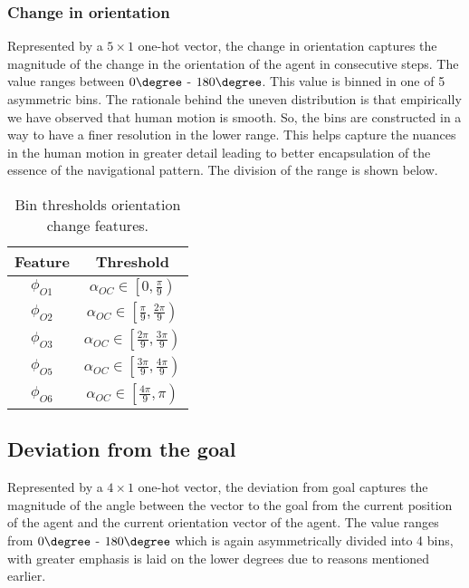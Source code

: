 \subsubsection*{Change in orientation}
Represented by a $5 \times 1$ one-hot vector, the change in orientation captures the magnitude of the change in the orientation of the agent in consecutive steps. The value ranges between $0 \degree$ -  $ 180 \degree$. This value is binned in one of 5 asymmetric bins. The rationale behind the uneven distribution is that empirically we have observed that human motion is smooth. So, the bins are constructed in a way to have a finer resolution in the lower range. This helps capture the nuances in the human motion in greater detail leading to better encapsulation of the essence of the navigational pattern. The division of the range is shown below.

\begin{table}[htbp]
	\caption{Bin thresholds orientation change features.}
	\label{orientation-change-bins}
	\begin{center}
		\renewcommand{\arraystretch}{1.3}
		\begin{tabular}{|c|c|}
			\hline
			Feature & Threshold \\
			\hline
			$\phi_{O1}$ & $\alpha_{OC} \in \left[ 0 , \frac{\pi}{9} \right)$ \\
			
			$\phi_{O2}$ & $\alpha_{OC} \in \left[ \frac{\pi}{9} , \frac{2\pi}{9} \right)$ \\
			
			$\phi_{O3}$ & $\alpha_{OC} \in \left[ \frac{2\pi}{9} , \frac{3\pi}{9} \right)$ \\
	
			
			$\phi_{O5}$ & $\alpha_{OC} \in \left[ \frac{3\pi}{9} , \frac{4\pi}{9} \right)$ \\
			
			$\phi_{O6}$ & $\alpha_{OC} \in \left[ \frac{4\pi}{9} , \pi \right)$ \\
			\hline
		\end{tabular}
	\end{center}
\end{table}
\subsection*{Deviation from the goal}
Represented by a $4 \times 1$ one-hot vector, the deviation from goal captures the magnitude of the angle between the vector to the goal from the current position of the agent and the current orientation vector of the agent. The value ranges from $0 \degree$ - $ 180 \degree$ which is again asymmetrically divided into 4 bins, with greater emphasis is laid on the lower degrees due to reasons mentioned earlier.

